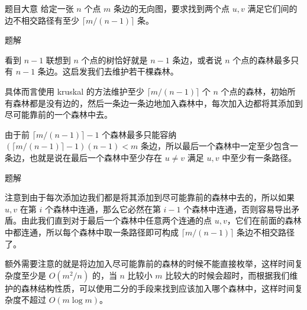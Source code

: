 \begin{frame}{题目大意}
	给定一张 $n$ 个点 $m$ 条边的无向图，要求找到两个点 $u,v$ 满足它们间的边不相交路径有至少 $\lceil m/(n-1)\rceil$ 条。
\end{frame}

\begin{frame}{题解}

看到 $n-1$ 联想到 $n$ 个点的树恰好就是 $n-1$ 条边，或者说 $n$ 个点的森林最多只有 $n-1$ 条边。这启发我们去维护若干棵森林。\pause

具体而言使用 kruskal 的方法维护至少 $\lceil m/(n-1)\rceil$ 个 $n$ 个点的森林，初始所有森林都是没有边的，然后一条边一条边地加入森林中，每次加入边都将其添加到尽可能靠前的一个森林中去。\pause

由于前 $\lceil m/(n-1)\rceil-1$ 个森林最多只能容纳 $(\lceil m/(n-1)\rceil-1)(n-1)<m$ 条边，所以最后一个森林中一定至少包含一条边，也就是说在最后一个森林中至少存在 $u\ne v$ 满足 $u,v$ 中至少有一条路径。

\end{frame}

\begin{frame}{题解}

注意到由于每次添加边我们都是将其添加到尽可能靠前的森林中去的，所以如果 $u,v$ 在第 $i$ 个森林中连通，那么它必然在第 $i-1$ 个森林中连通，否则容易导出矛盾。由此我们直到对于最后一个森林中任意两个连通的点 $u,v$，它们在前面的森林中都连通，所以每个森林中取一条路径即可构成 $\lceil m/(n-1)\rceil$ 条边不相交路径了。\pause

额外需要注意的就是将边加入尽可能靠前的森林的时候不能直接枚举，这样时间复杂度至少是 $O(m^2/n)$ 的，当 $n$ 比较小 $m$ 比较大的时候会超时，而根据我们维护的森林结构性质，可以使用二分的手段来找到应该加入哪个森林中，这样时间复杂度不超过 $O(m\log m)$。
	
\end{frame}